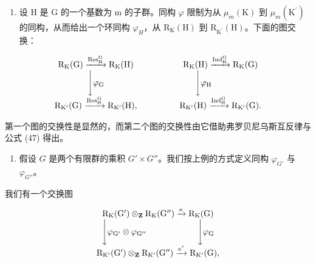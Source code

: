 \begin{enumerate}
\def\labelenumi{\arabic{enumi})}
\setcounter{enumi}{3}
\tightlist
\item
  设 H 是 G 的一个基数为 m 的子群。同构 \(\varphi\) 限制为从 \(\mu_{m}(\mathrm{K})\) 到 \(\mu_{m}(\mathrm{K}^{\prime})\) 的同构，从而给出一个环同构 \(\varphi_{H}\)，从 \(\mathrm{R}_{\mathrm{K}}(\mathrm{H})\) 到 \(\mathrm{R}_{\mathrm{K}^{\prime}}(\mathrm{H})\)。下面的图交换：
\end{enumerate}

\[
\begin{array}{c c} \mathrm {R_ {K} (G)} \xrightarrow {\mathrm {Res_ {H} ^ {G}}} \mathrm {R_ {K} (H)} & \qquad \qquad \mathrm {R_ {K} (H)} \xrightarrow {\mathrm {Ind_ {H} ^ {G}}} \mathrm {R_ {K} (G)} \\ \Biggl \downarrow \varphi_ {\mathrm{G}} & \Biggl \downarrow \varphi_ {\mathrm{H}} \\ \mathrm {R_ {K^ {\prime}} (G)} \xrightarrow {\mathrm {Res_ {H} ^ {G}}} \mathrm {R_ {K^ {\prime}} (H)}, & \qquad \qquad \mathrm {R_ {K^ {\prime}} (H)} \xrightarrow {\mathrm {Ind_ {H} ^ {G}}} \mathrm {R_ {K^ {\prime}} (G)}. \end{array}
\]

第一个图的交换性是显然的，而第二个图的交换性由它借助弗罗贝尼乌斯互反律与公式 (47) 得出。

\begin{enumerate}
\def\labelenumi{\arabic{enumi})}
\setcounter{enumi}{4}
\tightlist
\item
  假设 \(G\) 是两个有限群的乘积 \(G' \times G''\)。我们按上例的方式定义同构 \(\varphi_{G'}\) 与 \(\varphi_{G''}\)。
\end{enumerate}

我们有一个交换图

\[
\begin{array}{c} \mathrm{R} _ {\mathrm{K}} (\mathrm{G} ^ {\prime}) \otimes_ {\mathbf {Z}} \mathrm{R} _ {\mathrm{K}} (\mathrm{G} ^ {\prime \prime}) \xrightarrow {\kappa} \mathrm{R} _ {\mathrm{K}} (\mathrm{G}) \\ \Biggl \downarrow \varphi_ {\mathrm{G} ^ {\prime}} \otimes \varphi_ {\mathrm{G} ^ {\prime \prime}} \qquad \qquad \qquad \Biggl \downarrow \varphi_ {\mathrm{G}} \\ \mathrm{R} _ {\mathrm{K} ^ {\prime}} (\mathrm{G} ^ {\prime}) \otimes_ {\mathbf {Z}} \mathrm{R} _ {\mathrm{K} ^ {\prime}} (\mathrm{G} ^ {\prime \prime}) \xrightarrow {\kappa^ {\prime}} \mathrm{R} _ {\mathrm{K} ^ {\prime}} (\mathrm{G})  , \end{array}
\]

